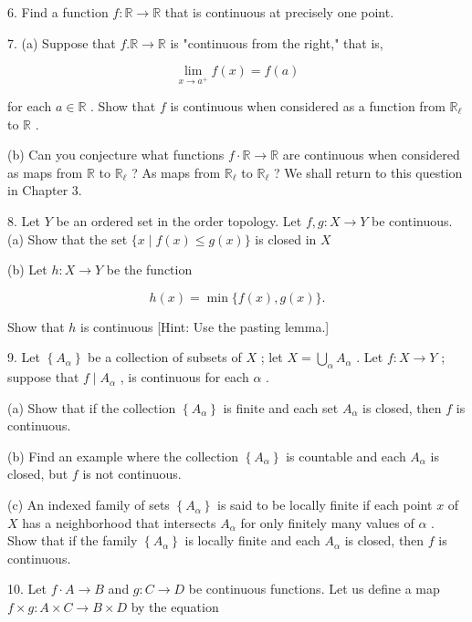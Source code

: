 6. Find a function \(f : \mathbb{R} \rightarrow  \mathbb{R}\) that is continuous at precisely one point.

7. (a) Suppose that \(f.\mathbb{R} \rightarrow  \mathbb{R}\) is "continuous from the right," that is,

\[
\mathop{\lim }\limits_{{x \rightarrow  {a}^{ + }}}f\left( x\right)  = f\left( a\right)
\]

for each \(a \in  \mathbb{R}\) . Show that \(f\) is continuous when considered as a function from \({\mathbb{R}}_{\ell }\) to \(\mathbb{R}\) .

(b) Can you conjecture what functions \(f \cdot  \mathbb{R} \rightarrow  \mathbb{R}\) are continuous when considered as maps from \(\mathbb{R}\) to \({\mathbb{R}}_{\ell }\) ? As maps from \({\mathbb{R}}_{\ell }\) to \({\mathbb{R}}_{\ell }\) ? We shall return to this question in Chapter 3.

8. Let \(Y\) be an ordered set in the order topology. Let \(f,g : X \rightarrow  Y\) be continuous. (a) Show that the set \(\{ x \mid  f\left( x\right)  \leq  g\left( x\right) \}\) is closed in \(X\)

(b) Let \(h : X \rightarrow  Y\) be the function

\[
h\left( x\right)  = \min \{ f\left( x\right) ,g\left( x\right) \} .
\]

Show that \(h\) is continuous [Hint: Use the pasting lemma.]

9. Let \(\left\{  {A}_{\alpha }\right\}\) be a collection of subsets of \(X\) ; let \(X = \mathop{\bigcup }\limits_{\alpha }{A}_{\alpha }\) . Let \(f : X \rightarrow  Y\) ; suppose that \(f \mid  {A}_{\alpha }\) , is continuous for each \(\alpha\) .

(a) Show that if the collection \(\left\{  {A}_{\alpha }\right\}\) is finite and each set \({A}_{\alpha }\) is closed, then \(f\) is continuous.

(b) Find an example where the collection \(\left\{  {A}_{\alpha }\right\}\) is countable and each \({A}_{\alpha }\) is closed, but \(f\) is not continuous.

(c) An indexed family of sets \(\left\{  {A}_{\alpha }\right\}\) is said to be locally finite if each point \(x\) of \(X\) has a neighborhood that intersects \({A}_{\alpha }\) for only finitely many values of \(\alpha\) . Show that if the family \(\left\{  {A}_{\alpha }\right\}\) is locally finite and each \({A}_{\alpha }\) is closed, then \(f\) is continuous.

10. Let \(f \cdot  A \rightarrow  B\) and \(g : C \rightarrow  D\) be continuous functions. Let us define a map \(f \times  g : A \times  C \rightarrow  B \times  D\) by the equation


